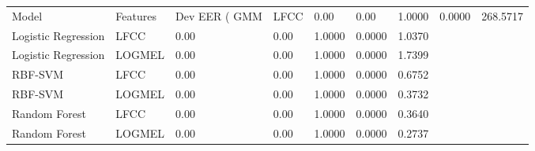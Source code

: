 \begin{tabular}{lllllll}
\toprule
Model & Features & Dev EER (%
\midrule
GMM & LFCC & 0.00 & 0.00 & 1.0000 & 0.0000 & 268.5717 \\
Logistic Regression & LFCC & 0.00 & 0.00 & 1.0000 & 0.0000 & 1.0370 \\
Logistic Regression & LOGMEL & 0.00 & 0.00 & 1.0000 & 0.0000 & 1.7399 \\
RBF-SVM & LFCC & 0.00 & 0.00 & 1.0000 & 0.0000 & 0.6752 \\
RBF-SVM & LOGMEL & 0.00 & 0.00 & 1.0000 & 0.0000 & 0.3732 \\
Random Forest & LFCC & 0.00 & 0.00 & 1.0000 & 0.0000 & 0.3640 \\
Random Forest & LOGMEL & 0.00 & 0.00 & 1.0000 & 0.0000 & 0.2737 \\
\bottomrule
\end{tabular}

